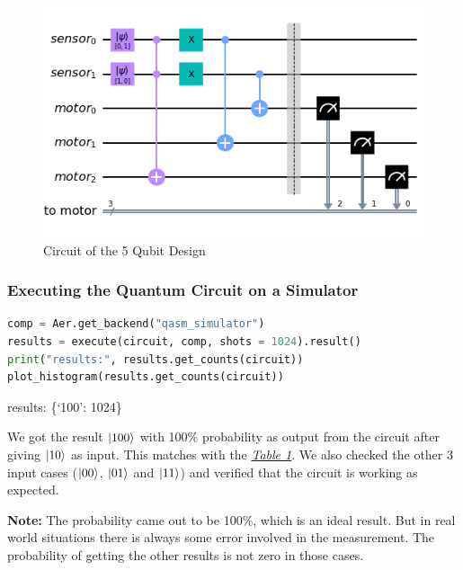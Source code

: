 \begin{figure}[h]%
	\centering
	\includegraphics[width=0.9\linewidth]{./images/5qubit_qc.png}
	\caption{Circuit of the 5 Qubit Design}%
	\label{fig:5qubit_qc}%
\end{figure}

\subsubsection{Executing the Quantum Circuit on a Simulator}
\label{code:executing_the_quantum_circuit_on_a_simulator}
\begin{lstlisting}[language=Python]
comp = Aer.get_backend("qasm_simulator")
results = execute(circuit, comp, shots = 1024).result()
print("results:", results.get_counts(circuit))
plot_histogram(results.get_counts(circuit))\end{lstlisting}

{\selectfont \noindent results: \{`100': 1024\}}
\vspace{5mm}

We got the result $\ket{100}$ with 100\% probability as output from the circuit after giving $\ket{10}$ as input. This matches with the \hyperref[table:1]{\textit{Table 1}}. We also checked the other 3 input cases ($\ket{00}$, $\ket{01}$ and $\ket{11}$) and verified that the circuit is working as expected.

\textbf{Note:} The probability came out to be 100\%, which is an ideal result. But in real world situations there is always some error involved in the measurement. The probability of getting the other results is not zero in those cases.

